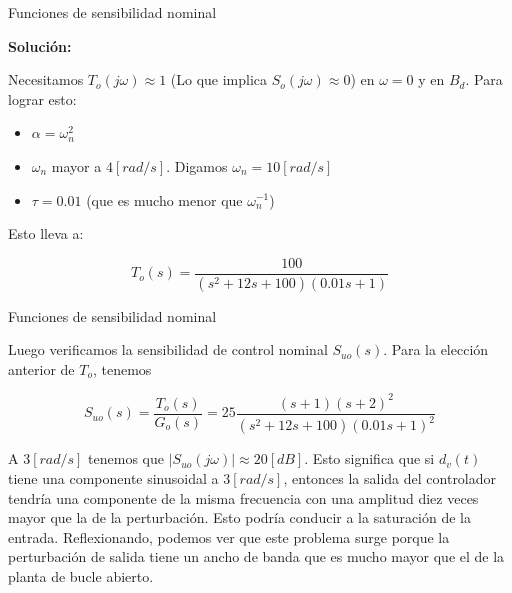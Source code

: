 \documentclass{beamer}
\begin{document}
\begin{frame}{Funciones de sensibilidad nominal}
\begin{justify}
\textbf{Solución:}

\vspace{0.3 cm}
Necesitamos $T_o(j\omega)\approx 1$ (Lo que implica $S_o(j\omega)\approx 0$) en $\omega = 0$ y en $B_d$. Para lograr esto:

\vspace{0.3 cm}
\begin{itemize}
    \item $\alpha = \omega_n^2$
    \item $\omega_n$ mayor a $4[rad/s]$.  Digamos $\omega_n = 10[rad/s]$
    \item $\tau = 0.01$ (que es mucho menor que $\omega_n^{-1}$)
\end{itemize}

\vspace{0.3 cm}
Esto lleva a:

\vspace{0.3 cm}
\begin{equation}
    T_o(s) = \frac{100}{(s^2 + 12s + 100)(0.01s + 1)}
\end{equation}

\end{justify}
\end{frame}


\begin{frame}{Funciones de sensibilidad nominal}
\begin{justify}

Luego verificamos la sensibilidad de control nominal $S_{uo}(s)$. Para la elección anterior de $T_o$, tenemos

\vspace{0.3 cm}
{\small
\begin{equation*}
    S_{uo}(s) = \frac{T_o(s)}{G_o(s)} = 25\frac{(s+1)(s+2)^{2}}{(s^2 + 12s + 100)(0.01s + 1)^{2}}
\end{equation*}
}

\vspace{0.3 cm}
A ${3}[rad/s]$ tenemos que $|S_{uo}(j\omega)| \approx {20}[dB]$. Esto significa que si $d_v(t)$ tiene una componente sinusoidal a ${3}[rad/s]$, entonces la salida del controlador tendría una componente de la misma frecuencia con una amplitud diez veces mayor que la de la perturbación.
Esto podría conducir a la saturación de la entrada. Reflexionando, podemos ver que este
problema surge porque la perturbación de salida tiene un ancho de banda que es mucho
mayor que el de la planta de bucle abierto.

\end{justify}
\end{frame}
\end{document}
